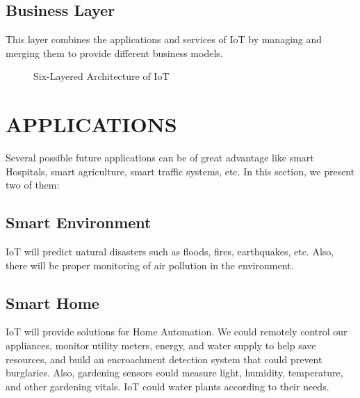 \documentclass[twoside,twocolumn]{article}
\begin{document}
    \subsection{Business Layer}
        \noindent This layer combines the applications and services of IoT by managing and merging them to provide different business models.
    \begin{figure}
        \centering
        \caption{Six-Layered Architecture of IoT}
    \end{figure}

\section{APPLICATIONS}
    \noindent Several possible future applications can be of great advantage like smart Hospitals, smart agriculture, smart traffic systems, etc. In this section, we present two of them:
    \subsection{Smart Environment}
        \noindent IoT will predict natural disasters such as floods, fires, earthquakes, etc. Also, there will be proper monitoring of air pollution in the environment.
    \subsection{Smart Home}
        \noindent IoT will provide solutions for Home Automation. We could remotely control our appliances, monitor utility meters, energy, and water supply to help save resources, and build an encroachment detection system that could prevent burglaries. Also, gardening sensors could measure light, humidity, temperature, and other gardening vitals. IoT could water plants according to their needs.
\end{document}
